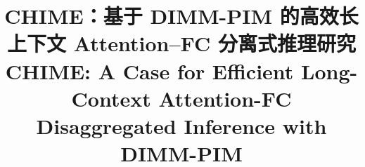 \documentclass[conference]{IEEEtran}
\newcommand{\sys}{\textsc{CHIME}\xspace}
\begin{document}
\pdfpagewidth=8.5in
\pdfpageheight=11in

\title{\sys：基于 DIMM-PIM 的高效长上下文 Attention--FC 分离式推理研究\\
\large CHIME: A Case for Efficient Long-Context Attention-FC Disaggregated Inference with DIMM-PIM}
\author{
}

\maketitle
\renewcommand{\thefootnote}{\fnsymbol{footnote}}
\renewcommand{\thefootnote}{\arabic{footnote}}
\thispagestyle{plain}
\pagestyle{plain}












\renewcommand{\refname}{参考文献}
\balance

\end{document}
